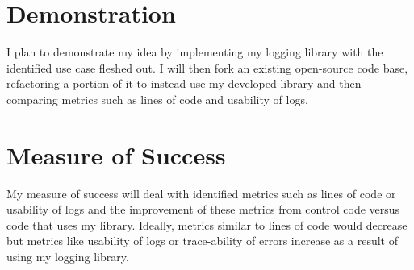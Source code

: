 \documentclass{article}
\begin{document}
\section{Demonstration} I plan to demonstrate my idea by implementing my logging library with the identified use case fleshed out. I will then fork an existing open-source code base, refactoring a portion of it to instead use my developed library and then comparing metrics such as lines of code and usability of logs. 

\section{Measure of Success} My measure of success will deal with identified metrics such as lines of code or usability of logs and the improvement of these metrics from control code versus code that uses my library. Ideally, metrics similar to lines of code would decrease but metrics like usability of logs or trace-ability of errors increase as a result of using my logging library.
\end{document}
